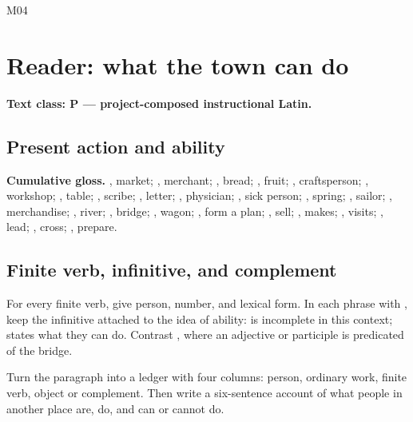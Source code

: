 \begin{courseunit}{M04}
\chapter{Reader: what the town can do}

\textbf{Text class: P --- project-composed instructional Latin.}

\section{Present action and ability}


\textbf{Cumulative gloss.} , market; , merchant;
, bread; , fruit; , craftsperson;
, workshop; , table; , scribe;
, letter; , physician; , sick
person; , spring; , sailor;
, merchandise; , river; , bridge;
, wagon; , form a plan;
, sell; , makes; , visits;
, lead; , cross; , prepare.

\section{Finite verb, infinitive, and complement}

For every finite verb, give person, number, and lexical form.  In each phrase
with , keep the infinitive attached to the idea of ability:
 is incomplete in this context;  states what they can do.  Contrast , where an
adjective or participle is predicated of the bridge.

Turn the paragraph into a ledger with four columns: person, ordinary work,
finite verb, object or complement.  Then write a six-sentence account of what
people in another place are, do, and can or cannot do.


\end{courseunit}
